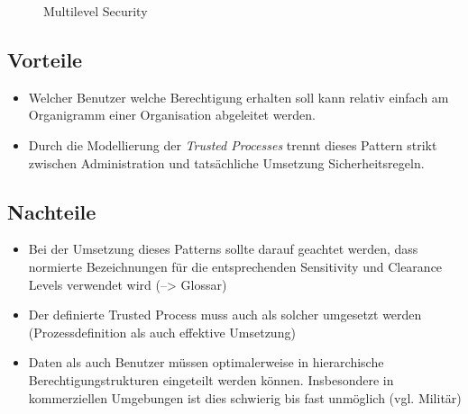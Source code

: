 \begin{figure}[H]
	\begin{center}
	\end{center}
\caption{Multilevel Security}
\end{figure}

\subsection*{Vorteile}
\begin{itemize}
	\item Welcher Benutzer welche Berechtigung erhalten soll kann relativ einfach am Organigramm einer Organisation abgeleitet werden.
	\item Durch die Modellierung der \emph{Trusted Processes} trennt dieses Pattern strikt zwischen Administration und tatsächliche Umsetzung Sicherheitsregeln.
\end{itemize}

\subsection*{Nachteile}
\begin{itemize}
	\item Bei der Umsetzung dieses Patterns sollte darauf geachtet werden, dass normierte Bezeichnungen für die entsprechenden Sensitivity und Clearance Levels verwendet wird (--> Glossar)
	\item Der definierte Trusted Process muss auch als solcher umgesetzt werden (Prozessdefinition als auch effektive Umsetzung)
	\item Daten als auch Benutzer müssen optimalerweise in hierarchische Berechtigungstrukturen eingeteilt werden können.
	Insbesondere in kommerziellen Umgebungen ist dies schwierig bis fast unmöglich (vgl. Militär)
\end{itemize}


